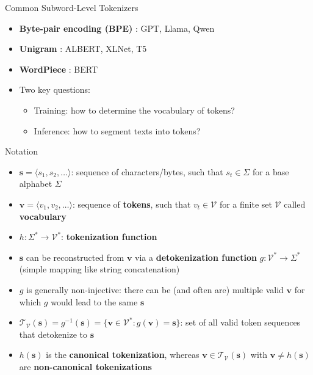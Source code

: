 \documentclass[11pt,compress,t,notes=noshow, xcolor=table]{beamer}
\newcommand{\vocab}{\mathcal{V}}
\begin{document}
\begin{frame}{Common Subword-Level Tokenizers}

\vfill

\begin{itemize}
\item \textbf{Byte-pair encoding (BPE)} : GPT, Llama, Qwen 
\item \textbf{Unigram} : ALBERT, XLNet, T5
\item \textbf{WordPiece} : BERT

\item Two key questions:
\begin{itemize}
\item Training: how to determine the vocabulary of tokens?
\item Inference: how to segment texts into tokens?

\end{itemize}

\end{itemize}



\vfill

\end{frame}


\begin{frame}{Notation}

\vfill


\begin{itemize}
\item $\mathbf{s} = \langle s_1, s_2, \dots \rangle$: sequence of characters/bytes, such that $s_t \in \Sigma$ for a base alphabet $\Sigma$
\item $\mathbf{v} = \langle v_1, v_2, \dots \rangle$: sequence of \textbf{tokens}, such that $v_t \in \vocab$ for a finite set $\vocab$ called \textbf{vocabulary}
\item $h: \Sigma^* \to \vocab^*$: \textbf{tokenization function}
\item $\mathbf{s}$ can be reconstructed from $\mathbf{v}$ via a \textbf{detokenization function} $g: \vocab^* \to \Sigma^* $ (simple mapping like string concatenation)
\item $g$ is generally non-injective: there can be (and often are) multiple valid $\mathbf{v}$ for which $g$ would lead to the same $\mathbf{s}$
\item $\mathcal{T}_{\vocab}(\mathbf{s}) = g^{-1}(\mathbf{s}) = \{ \mathbf{v} \in \vocab^* : g(\mathbf{v}) = \mathbf{s}\}$: set of all valid token sequences that detokenize to $\mathbf{s}$
\item $h(\mathbf{s})$ is the \textbf{canonical tokenization}, whereas $\mathbf{v} \in \mathcal{T}_{\vocab}(\mathbf{s})$ with $\mathbf{v} \neq h(\mathbf{s})$ are \textbf{non-canonical tokenizations}
\end{itemize}

\vfill


\end{frame}
\end{document}
